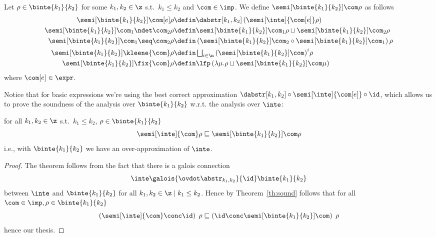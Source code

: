 \begin{definition}\label{def:boundedanalysis}
  Let \(\rho \in \binte{k_1}{k_2}\) for some \(k_1, k_2 \in \z\) s.t.\
  \(k_1 \leq k_2\) and \(\com \in \imp\). We define
  \(\semi[\binte{k_1}{k_2}]{\com}\rho\) as follows
  \begin{align*}
    \semi[\binte{k_1}{k_2}]{\com[e]}\rho & \defin \dabstr[k_1,k_2] \left(\semi[\inte]{\com[e]}\rho\right) \\
    \semi[\binte{k_1}{k_2}]{\com_1 \ndet \com_2}\rho & \defin \semi[\binte{k_1}{k_2}]{\com_1}\rho \sqcup \semi[\binte{k_1}{k_2}]{\com_2}\rho \\
    \semi[\binte{k_1}{k_2}]{\com_1 \seq \com_2}\rho & \defin \left(\semi[\binte{k_1}{k_2}]{\com_2} \circ \semi[\binte{k_1}{k_2}]{\com_1}\right)\rho \\
    \semi[\binte{k_1}{k_2}]{\kleene{\com}}\rho & \defin \textstyle\bigsqcup_{i\in\n}{\left({\semi[\binte{k_1}{k_2}]{\com}}\right)}^i\rho \\
    \semi[\binte{k_1}{k_2}]{\fix{\com}}\rho & \defin \lfp\left(\lambda \mu . \rho \sqcup \semi[\binte{k_1}{k_2}]{\com}\mu\right)
  \end{align*}
  where \(\com[e]\in\expr\). 
\end{definition}
\noindent
Notice that for basic expressions we're using the best correct
approximation
\(\dabstr[k_1,k_2] \circ \semi[\inte]{\com[e]} \circ \id\), which
allows us to prove the soundness of the analysis over
\(\binte{k_1}{k_2}\) w.r.t. the analysis over \(\inte\):
\begin{lemma}\label{le:leq}
  for all \(k_1, k_2\in\z\) s.t.\ \(k_1 \leq k_2\),
  \(\rho \in \binte{k_1}{k_2}\)
  \begin{equation*}
    \semi[\inte]{\com}\rho \sqsubseteq \semi[\binte{k_1}{k_2}]{\com}\rho
  \end{equation*}
  i.e., with \(\binte{k_1}{k_2}\) we have an over-approximation of \(\inte\).
\end{lemma}

\begin{proof}
  The theorem follows from the fact that there is a galois connection
  \begin{equation*}
    \inte\galois{\ovdot\abstr_{k_1, k_2}}{\id}\binte{k_1}{k_2}
  \end{equation*}
  between \(\inte\) and \(\binte{k_1}{k_2}\) for all
  \(k_1, k_2 \in \z \mid k_1 \leq k_2\). Hence by
  Theorem~\ref{th:sound} follows that for all
  \(\com\in\imp, \rho \in \binte{k_1}{k_2}\)
  \begin{equation*}
    \left(\semi[\inte]{\com} \conc \id \right)\;\rho \sqsubseteq  \left(\id \conc \semi[\binte{k_1}{k_2}]{\com}\right)\;\rho
  \end{equation*}
  hence our thesis.
\end{proof}

